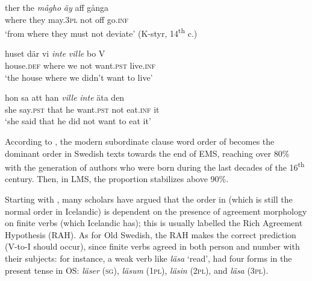 \documentclass[output=paper]{langscibook}
\begin{document}
\ea\label{ex:intro:5}
\ea\label{ex:intro:5a}
\gll  ther     the \textit{mågho} \textit{äy} aff   gånga                \\
where   they   may.3\textsc{pl}   not   off   go\textsc{.inf}\\
\glt ‘from where they must not deviate’ (K-styr, 14\textsuperscript{th} c.)


\ex\label{ex:intro:5b}
\gll  huset       där     vi \textit{inte} \textit{ville} {bo}           V \\
        house.\textsc{def}     where   we     not   want.\textsc{pst}       live.\textsc{inf}\\
\glt        ‘the house where we didn’t want to live’


\ex\label{ex:intro:5c}
\gll  hon   sa   att   han   \textit{ville}       \textit{inte}   äta     den    \\
        she         say.\textsc{pst} that he   want.\textsc{pst}  not   eat.\textsc{inf}  it\\
\glt         ‘she said that he did not want to eat it’
\z
\z

According to \citet[176]{Falk1993}, the modern subordinate clause word order of  becomes the dominant order in Swedish texts towards the end of EMS, reaching over 80\% with the generation of authors who were born during the last decades of the 16\textsuperscript{th} century. Then, in LMS, the proportion stabilizes above 90\%.



Starting with \citet{Kosmeijer1986}, many scholars have argued that the order in  (which is still the normal order in Icelandic) is dependent on the presence of agreement morphology on finite verbs (which Icelandic has); this is usually labelled the Rich Agreement Hypothesis (RAH). As for Old Swedish, the RAH makes the correct prediction (V-to-I should occur), since finite verbs agreed in both person and number with their subjects: for instance, a weak verb like \textit{läsa} ‘read’, had four forms in the present tense in OS: \textit{läser} (\textsc{sg}), \textit{läsum} (1\textsc{pl}), \textit{läsin} (2\textsc{pl}), and \textit{läsa} (3\textsc{pl}).
\end{document}
